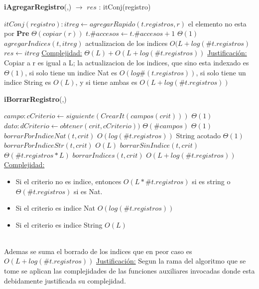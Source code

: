 \begin{algorithm}[H]{\textbf{iAgregarRegistro}(,) $\to$ $res$ : itConj(registro)}
	\begin{algorithmic}[1]
		\State $itConj(registro): itreg \gets agregarRapido(t.registros,r)$ \Comment el elemento no esta por \textbf{Pre} $\Theta(copiar(r))$
		\State $t.\#accesos \gets t.\#accesos + 1$ \Comment $\Theta(1)$
		\State $agregarIndices(t,itreg)$	\Comment actualizacion de los indices $O(L + log(\#t.registros)$
		\State $res \gets itreg$
		\medskip
		\Statex \underline{Complejidad:} $\Theta(L) + O(L + log (\#t.registros))$
		\Statex \underline{Justificación:} Copiar a r es igual a L; la actualizacion de los indices, que sino esta indexado es $\Theta(1)$, si solo tiene un indice Nat es $O(log \#(t.registros))$, si solo tiene un indice String es $O(L)$, y si tiene ambas es $O(L + log(\#t.registros))$

	\end{algorithmic}
\end{algorithm}


\begin{algorithm}[H]{\textbf{iBorrarRegistro}(,)}
	\begin{algorithmic}[1]
		\State $campo: cCriterio \gets siguiente(CrearIt(campos(crit)))$ \Comment $\Theta(1)$
		\State $dato: dCriterio \gets obtener(crit,cCriterio))$	\Comment $\Theta(\#campos)$
			\Comment $\Theta(1)$
			\State $borrarPorIndiceNat(t,crit)$ \Comment $O(log(\#t.registros))$
		\Else
				\Comment String acotado $\Theta(1)$
				\State $borrarPorIndiceStr(t,crit)$ \Comment $O(L)$
			\Else
				\State $borrarSinIndice(t,crit)$ \Comment $\Theta(\#t.registros * L)$
			\EndIf
		\EndIf
		\State $borrarIndices(t,crit)$ \Comment $O(L + log(\#t.registros))$
		\medskip
		\Statex \underline{Complejidad:}
		\begin{itemize}
		\item Si el criterio no es indice, entonces $O(L * \#t.registros)$ si es string o $\Theta(\#t.registros)$ si es Nat. 
		\item Si el criterio es indice Nat $O(log(\#t.registros))$
		\item Si el criterio es indice String $O(L)$ 
		\end{itemize}
		\\
		Ademas se suma el borrado de los indices que en peor caso es $O(L+log(\#t.registros))$
		\Statex \underline{Justificación:} Segun la rama del algoritmo que se tome se aplican las complejidades de las funciones auxiliares invocadas donde esta debidamente justificada su complejidad. 
	\end{algorithmic}
\end{algorithm}

